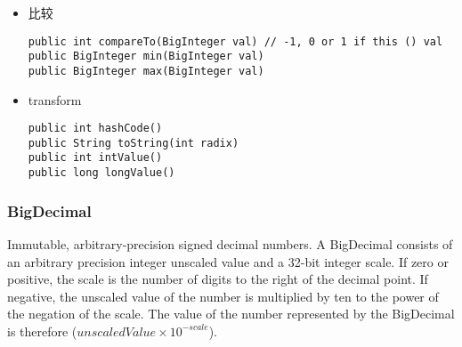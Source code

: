 \begin{itemize}
\item 比较
\begin{lstlisting}
public int compareTo(BigInteger val) // -1, 0 or 1 if this () val
public BigInteger min(BigInteger val)
public BigInteger max(BigInteger val)
\end{lstlisting}

\item transform
\begin{lstlisting}
public int hashCode()
public String toString(int radix)
public int intValue()
public long longValue()
\end{lstlisting}
\end{itemize}

\subsubsection{BigDecimal}

Immutable, arbitrary-precision signed decimal numbers.
A BigDecimal consists of an arbitrary precision integer unscaled value and a 32-bit integer scale.
If zero or positive, the scale is the number of digits to the right of the decimal point.
If negative, the unscaled value of the number is multiplied by ten to the power of the negation of the scale.
The value of the number represented by the BigDecimal is therefore ($unscaledValue \times 10^{-scale}$).

